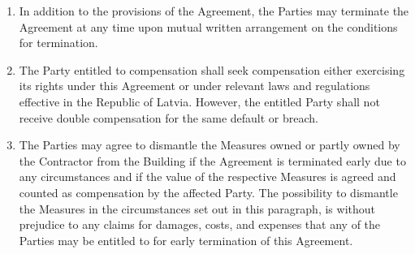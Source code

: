 \begin{multicols}{2}
\begin{enumerate}
	\item	In addition to the provisions of the Agreement, the Parties may terminate the Agreement at any time upon mutual written arrangement on the conditions for termination.
	\item	The Party entitled to compensation shall seek compensation either exercising its rights under this Agreement or under relevant laws and regulations effective in the Republic of Latvia. However, the entitled Party shall not receive double compensation for the same default or breach.
	\item	The Parties may agree to dismantle the Measures owned or partly owned by the Contractor from the Building if the Agreement is terminated early due to any circumstances and if the value of the respective Measures is agreed and counted as compensation by the affected Party. The possibility to dismantle the Measures in the circumstances set out in this paragraph, is without prejudice to any claims for damages, costs, and expenses that any of the Parties may be entitled to for early termination of this Agreement.
\end{enumerate}


\end{multicols}
